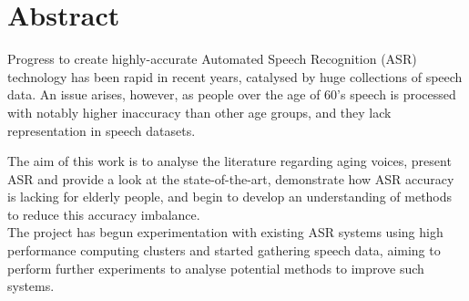 \chapter*{\Large \center Abstract}

Progress to create highly-accurate Automated Speech Recognition (ASR) technology has been rapid
in recent years, catalysed by huge collections of speech data.
An issue arises, however, as people over the age of 60's speech is processed with notably higher
inaccuracy than other age groups, and they lack representation in speech datasets.

The aim of this work is to analyse the literature regarding aging voices, present ASR and
provide a look at the state-of-the-art, demonstrate how ASR accuracy is lacking for elderly
people, and begin to develop an understanding of methods to reduce this accuracy imbalance.\\

The project has begun experimentation with existing ASR systems using high performance
computing clusters and started gathering speech data, aiming to perform further experiments to
analyse potential methods to improve such systems.
